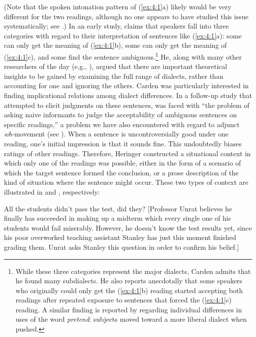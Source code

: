 \noindent
(Note that the spoken intonation pattern of (\ref{ex:4:1}a) likely would be very different for the two readings, although no one appears to have studied this issue systematically; see .) In an early study, \citet{Carden1970b} claims that speakers fall into three categories with regard to their interpretation of sentences like (\ref{ex:4:1}a): some can only get the meaning of (\ref{ex:4:1}b), some can only get the meaning of (\ref{ex:4:1}c), and some find the sentence ambiguous.\footnote{While these three categories represent the major dialects, Carden admits that he found many subdialects. He also reports anecdotally that some speakers who originally could only get the (\ref{ex:4:1}b) reading started accepting both readings after repeated exposure to sentences that forced the (\ref{ex:4:1}c) reading. A similar finding is reported by \citet{Neubauer1976} regarding individual differences in uses of the word \textit{pretend}: subjects moved toward a more liberal dialect when pushed.}
 He, along with many other researchers of the day (e.g., \citealt{ElliotEtAl1969}), argued that there are important theoretical insights to be gained by examining the full range of dialects, rather than accounting for one and ignoring the others. Carden was particularly interested in finding implicational relations among dialect differences. In a follow-up study that attempted to elicit judgments on these sentences, \citet{Heringer1970} was faced with ``the problem of asking naive informants to judge the acceptability of ambiguous sentences on specific readings,'' a problem we have also encountered with regard to adjunct \textit{wh}-movement (see ). When a sentence is uncontroversially good under one reading, one's initial impression is that it sounds fine. This undoubtedly biases ratings of other readings. Therefore, Heringer constructed a situational context in which only one of the readings was possible, either in the form of a scenario of which the target sentence formed the conclusion, or a prose description of the kind of situation where the sentence might occur. These two types of context are illustrated in  and , respectively:

 \ea \label{ex:4:2}
 All the students didn't pass the test, did they? [Professor Unrat believes he finally has succeeded in making up a midterm which every single one of
his students would fail miserably. However, he doesn't know the test results yet, since his poor overworked teaching assistant Stanley has just this moment finished grading them. Unrat asks Stanley this question in order to confirm his belief.]
\z

